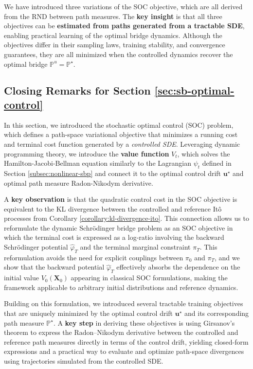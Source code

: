 \documentclass{article}
\begin{document}
We have introduced three variations of the SOC objective, which are all derived from the RND between path measures. The \textbf{key insight} is that all three objectives can be \textbf{estimated from paths generated from a tractable SDE}, enabling practical learning of the optimal bridge dynamics. Although the objectives differ in their sampling laws, training stability, and convergence guarantees, they are all minimized when the controlled dynamics recover the optimal bridge $\mathbb{P}^u=\mathbb{P}^\star$.

\subsection{Closing Remarks for Section \ref{sec:sb-optimal-control}}
In this section, we introduced the stochastic optimal control (SOC) problem, which defines a path-space variational objective that minimizes a running cost and terminal cost function generated by a \textit{controlled SDE}. Leveraging dynamic programming theory, we introduce the \textbf{value function} $V_t$, which solves the Hamilton-Jacobi-Bellman equation similarly to the Lagrangian $\psi_t$ defined in Section \ref{subsec:nonlinear-sbp} and connect it to the optimal control drift $\boldsymbol{u}^\star$ and optimal path measure Radon-Nikodym derivative.

A \textbf{key observation} is that the quadratic control cost in the SOC objective is equivalent to the KL divergence between the controlled and reference Itô processes from Corollary \ref{corollary:kl-divergence-ito}. This connection allows us to reformulate the dynamic Schrödinger bridge problem as an SOC objective in which the terminal cost is expressed as a log-ratio involving the backward Schrödinger potential $\hat\varphi_T$ and the terminal marginal constraint $\pi_T$. This reformulation avoids the need for explicit couplings between $\pi_0$ and $\pi_T$, and we show that the backward potential $\hat\varphi_T$ effectively absorbs the dependence on the initial value $V_0(\boldsymbol{X}_0)$ appearing in classical SOC formulations, making the framework applicable to arbitrary initial distributions and reference dynamics.

Building on this formulation, we introduced several tractable training objectives that are uniquely minimized by the optimal control drift $\boldsymbol{u}^\star$ and its corresponding path measure $\mathbb{P}^\star$. A \textbf{key step} in deriving these objectives is using Girsanov’s theorem to express the Radon–Nikodym derivative between the controlled and reference path measures directly in terms of the control drift, yielding closed-form expressions and a practical way to evaluate and optimize path-space divergences using trajectories simulated from the controlled SDE.
\end{document}
